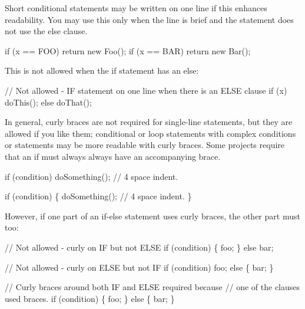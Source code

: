 Short conditional statements may be written on one line if this enhances readability. You may use this only when the line is brief and the statement does not use the else clause.


\begin{DoxyCode}
\textcolor{keywordflow}{if} (x == FOO) \textcolor{keywordflow}{return} \textcolor{keyword}{new} Foo();
\textcolor{keywordflow}{if} (x == BAR) \textcolor{keywordflow}{return} \textcolor{keyword}{new} Bar();
\end{DoxyCode}


This is not allowed when the if statement has an {\ttfamily else}\+:


\begin{DoxyCode}
\textcolor{comment}{// Not allowed - IF statement on one line when there is an ELSE clause}
\textcolor{keywordflow}{if} (x) doThis();
\textcolor{keywordflow}{else} doThat();
\end{DoxyCode}


In general, curly braces are not required for single-\/line statements, but they are allowed if you like them; conditional or loop statements with complex conditions or statements may be more readable with curly braces. Some projects require that an if must always always have an accompanying brace.


\begin{DoxyCode}
\textcolor{keywordflow}{if} (condition)
    doSomething();  \textcolor{comment}{// 4 space indent.}

\textcolor{keywordflow}{if} (condition) \{
    doSomething();  \textcolor{comment}{// 4 space indent.}
\}
\end{DoxyCode}


However, if one part of an if-\/else statement uses curly braces, the other part must too\+:


\begin{DoxyCode}
\textcolor{comment}{// Not allowed - curly on IF but not ELSE}
\textcolor{keywordflow}{if} (condition) \{
    foo;
\} \textcolor{keywordflow}{else}
    bar;

\textcolor{comment}{// Not allowed - curly on ELSE but not IF}
\textcolor{keywordflow}{if} (condition)
    foo;
\textcolor{keywordflow}{else} \{
    bar;
\}

\textcolor{comment}{// Curly braces around both IF and ELSE required because}
\textcolor{comment}{// one of the clauses used braces.}
\textcolor{keywordflow}{if} (condition) \{
    foo;
\} \textcolor{keywordflow}{else} \{
    bar;
\}
\end{DoxyCode}


